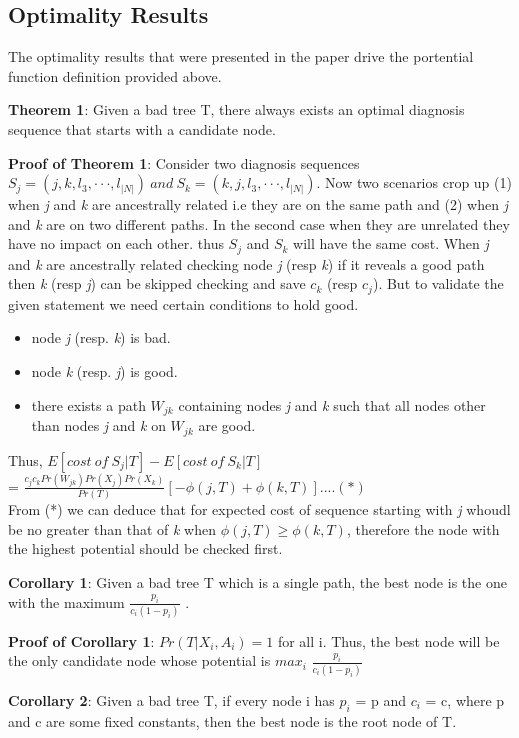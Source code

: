 \documentclass[10pt]{sigplan-proc-varsize}
\begin{document}
\subsection{Optimality Results}
The optimality results that were presented in the paper drive the portential function definition provided above. 

{\bf Theorem 1}: Given a bad tree T, there always exists an optimal diagnosis sequence that starts with a candidate node.

{\bf Proof of Theorem 1}: Consider two diagnosis sequences $S_j = (j,k,l_3,···,l_{|N|})\ and\ S_k = (k, j, l_3, · · · , l_{|N|})$. Now two scenarios crop up (1) when {\it j} and {\it k} are ancestrally related i.e they are on the same path and (2) when {\it j} and {\it k} are on two different paths.  In the second case when they are unrelated they have no impact on each other. thus $S_j$ and $S_k$ will have the same cost.  When  {\it j} and {\it k} are ancestrally related checking node {\it j} (resp {\it k}) if it reveals a good path then {\it k} (resp {\it j}) can be skipped checking and save $c_k$ (resp $c_j$). But to validate the given statement we need certain conditions to hold good.
\begin{itemize}
  \item node {\it j} (resp. {\it k}) is bad.
  \item node {\it k} (resp. {\it j}) is good.
  \item there exists a path $W_{jk}$ containing nodes {\it j} and {\it k} such that all nodes other than nodes {\it j} and {\it k} on $W_{jk}$ are good.
\end{itemize} Thus,
$E[cost\ of\ S_j|T ] - E[cost\ of\ S_k|T ]$ \\
 = $\frac{c_jc_kPr(W_{jk})Pr(X_j)Pr(X_k)}{Pr(T)}[-\phi(j,T)+\phi(k,T)] .... (*)$\\
From (*) we can deduce that for expected cost of sequence starting with {\it j}  whoudl be no greater than that of {\it k} when  $\phi(j,T) \geq \phi(k,T)$, therefore the node with the highest potential should be checked first.

{\bf Corollary 1}: Given a bad tree T which is a single path, the best node is the one with the maximum $\frac{p_i}{c_i(1-p_i)}$ .

{\bf Proof of Corollary 1}:  $Pr(T |X_i,A_i) = 1$ for all i. Thus, the best node will be
the only candidate node whose potential is $max_i$ $\frac{p_i}{c_i(1-p_i)}$

{\bf Corollary 2}: Given a bad tree T, if every node i has $p_i$ = p and $c_i$ = c, where p and c are some fixed constants, then the best node is the root node of T.
\end{document}
